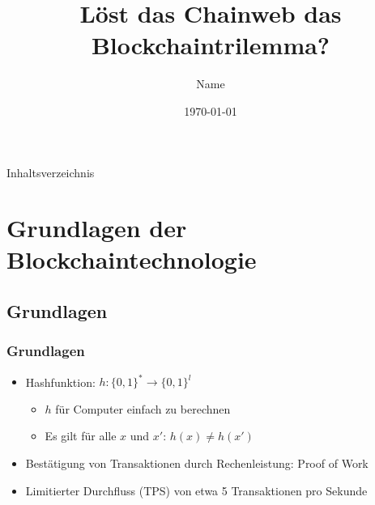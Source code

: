 \documentclass[10pt]{beamer}
\title{Löst das Chainweb das Blockchaintrilemma?}
\author{Name}
\date\today
\begin{document}
\begin{frame}[plain]
	\titlepage
\end{frame}


\begin{frame}{Inhaltsverzeichnis}
	\tableofcontents
\end{frame}

\section{Grundlagen der Blockchaintechnologie}

\subsection {Grundlagen}
\begin{frame}
	\frametitle{Grundlagen}
	\begin{itemize}
		\item Hashfunktion: $h : \{0,1\}^* \rightarrow \{0,1\}^l$
		      \begin{itemize}
		      	\item $h$ für Computer einfach zu berechnen
		      	\item Es gilt für alle $x$ und ${x}'$: $h(x) \neq h({x}')$
		      \end{itemize}
		\item Bestätigung von Transaktionen durch Rechenleistung: Proof of Work
		\item Limitierter Durchfluss (TPS) von etwa 5 Transaktionen pro Sekunde
	\end{itemize}
\end{frame}
\end{document}
